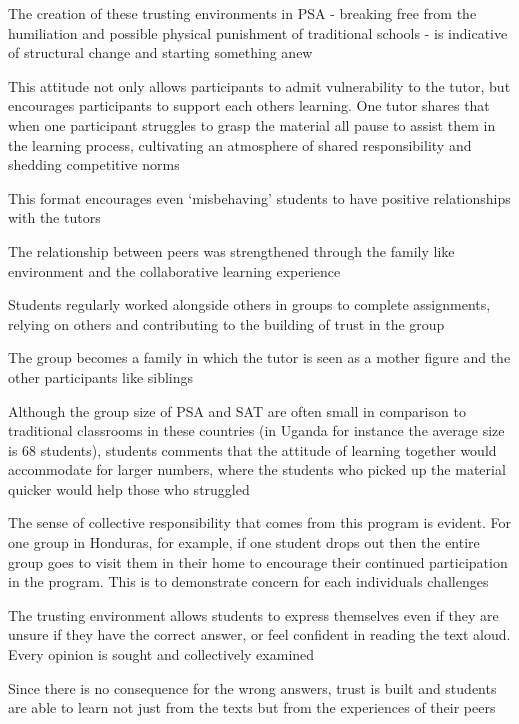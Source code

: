 The creation of these trusting environments in PSA - breaking free from the humiliation and possible physical punishment of traditional schools - is indicative of structural change and starting something anew \citep{Murphy-Graham2014}

This attitude not only allows participants to admit vulnerability to the tutor, but encourages participants to support each others learning. One tutor shares that when one participant struggles to grasp the material all pause to assist them in the learning process, cultivating an atmosphere of shared responsibility and shedding competitive norms \citep{Murphy-Graham2014}

This format encourages even `misbehaving' students to have positive relationships with the tutors \citep{Murphy-Graham2014}

The relationship between peers was strengthened through the family like environment and the collaborative learning experience \citep{Murphy-Graham2014}

Students regularly worked alongside others in groups to complete assignments, relying on others and contributing to the building of trust in the group \citep{Murphy-Graham2014}

The group becomes a family in which the tutor is seen as a mother figure and the other participants like siblings \citep{Murphy-Graham2014}

Although the group size of PSA and SAT are often small in comparison to traditional classrooms in these countries (in Uganda for instance the average size is 68 students), students comments that the attitude of learning together would accommodate for larger numbers, where the students who picked up the material quicker would help those who struggled \citep{Murphy-Graham2014}

The sense of collective responsibility that comes from this program is evident. For one group in Honduras, for example, if one student drops out then the entire group goes to visit them in their home to encourage their continued participation in the program. This is to demonstrate concern for each individuals challenges \citep{Murphy-Graham2014}

The trusting environment allows students to express themselves even if they are unsure if they have the correct answer, or feel confident in reading the text aloud. Every opinion is sought and collectively examined \citep{Murphy-Graham2014}

Since there is no consequence for the wrong answers, trust is built and students are able to learn not just from the texts but from the experiences of their peers \citep{Murphy-Graham2014}

